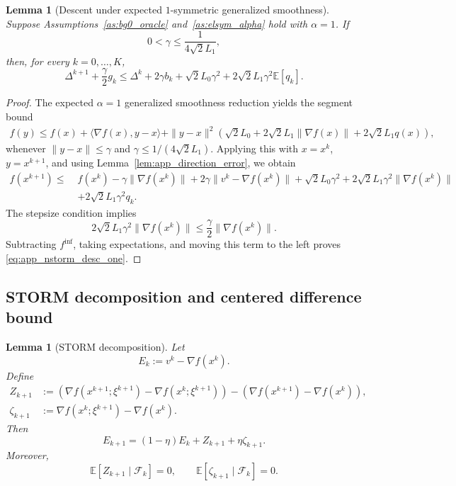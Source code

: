 \documentclass[letter,11pt]{article}
\newtheorem{lemma}[]{Lemma}
\newcommand{\E}{\mathbb{E}}
\newcommand{\cF}{\mathcal{F}}
\begin{document}
\begin{lemma}[Descent under expected \(1\)-symmetric generalized smoothness]
\label{lem:app_nstorm_desc_one}
Suppose Assumptions~\ref{as:bg0_oracle} and~\ref{as:elsym_alpha} hold with
\(\alpha=1\). If
\[
    0<\gamma\le \frac{1}{4\sqrt2L_1},
\]
then, for every \(k=0,\ldots,K\),
\begin{equation}
\label{eq:app_nstorm_desc_one}
    \Delta^{k+1}
    +
    \frac{\gamma}{2}g_k
    \le
    \Delta^k
    +
    2\gamma b_k
    +
    \sqrt2L_0\gamma^2
    +
    2\sqrt2L_1\gamma^2\E[q_k].
\end{equation}
\end{lemma}

\begin{proof}
The expected \(\alpha=1\) generalized smoothness reduction yields the segment
bound
\[
\begin{aligned}
    f(y)
    \le
    f(x)
    +
    \langle\nabla f(x),y-x\rangle
    +
    \|y-x\|^2
    \left(
        \sqrt2L_0
        +
        2\sqrt2L_1\|\nabla f(x)\|
        +
        2\sqrt2L_1q(x)
    \right),
\end{aligned}
\]
whenever \(\|y-x\|\le\gamma\) and
\(\gamma\le1/(4\sqrt2L_1)\). Applying this with
\(x=x^k\), \(y=x^{k+1}\), and using
Lemma~\ref{lem:app_direction_error}, we obtain
\[
\begin{aligned}
    f(x^{k+1})
    \le\;&
    f(x^k)
    -
    \gamma\|\nabla f(x^k)\|
    +
    2\gamma\|v^k-\nabla f(x^k)\| 
    +
    \sqrt2L_0\gamma^2
    +
    2\sqrt2L_1\gamma^2\|\nabla f(x^k)\|
    \\
    &+
    2\sqrt2L_1\gamma^2q_k.
\end{aligned}
\]
The stepsize condition implies
\[
    2\sqrt2L_1\gamma^2\|\nabla f(x^k)\|
    \le
    \frac{\gamma}{2}\|\nabla f(x^k)\|.
\]
Subtracting \(f^{\inf}\), taking expectations, and moving this term to the
left proves \eqref{eq:app_nstorm_desc_one}.
\end{proof}

\subsection{STORM decomposition and centered difference bound}
\label{app:nstorm_decomposition}

\begin{lemma}[STORM decomposition]
\label{lem:app_nstorm_decomp}
Let
\[
    E_k:=v^k-\nabla f(x^k).
\]
Define
\[
\begin{aligned}
    Z_{k+1}
    &:=
    \left(
        \nabla f(x^{k+1};\xi^{k+1})
        -
        \nabla f(x^k;\xi^{k+1})
    \right)
    -
    \left(
        \nabla f(x^{k+1})
        -
        \nabla f(x^k)
    \right),\\
    \zeta_{k+1}
    &:=
    \nabla f(x^k;\xi^{k+1})-\nabla f(x^k).
\end{aligned}
\]
Then
\begin{equation}
\label{eq:app_nstorm_decomp}
    E_{k+1}
    =
    (1-\eta)E_k+Z_{k+1}+\eta\zeta_{k+1}.
\end{equation}
Moreover,
\[
    \E[Z_{k+1}\mid\cF_k]=0,
    \qquad
    \E[\zeta_{k+1}\mid\cF_k]=0.
\]
\end{lemma}
\end{document}
